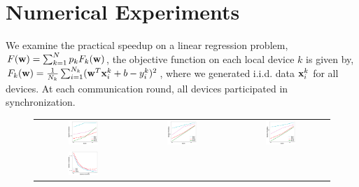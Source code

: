 


\section{Numerical Experiments}

We examine the practical speedup on a linear regression problem, 
$ F({\mathbf{w}}) = \sum_{k=1}^N p_kF_k({\mathbf{w}})$, the objective function on each local device $k$ is given by, $F_k({\mathbf{w}}) = \frac{1}{N_k} \sum_{i=1}^{N_k} ({\mathbf{w}}^T{\mathbf{x}}_i^k + b  - y_i^k)^2$, where we generated i.i.d. data ${\mathbf{x}}_i^k$ for all devices. At each communication round, all devices participated
in synchronization. 


\begin{figure}
\centering
	\begin{tabular}{ccc}
	\includegraphics[width=0.33\textwidth]{fig/paper-linregressionspeedupEpochsT-min-linearregressionw8a-epsilon002-reg0.pdf} & \includegraphics[width=0.33\textwidth]{fig/paper-stronglycvxsmthspeedupEpochsT-min-w8a-epsilon0131-reg1e-05.pdf} &
	\includegraphics[width=0.33\textwidth]{fig/paper-cvxsmoothspeedupEpochsT-min-w8a-epsilon0134-reg0.pdf}
\\
\includegraphics[width=0.33\textwidth]{fig/paper-linregressionspeedupNodesT-min-linearregressionw8a-epsilon002-reg0.pdf}

\end{tabular}
\end{figure}
